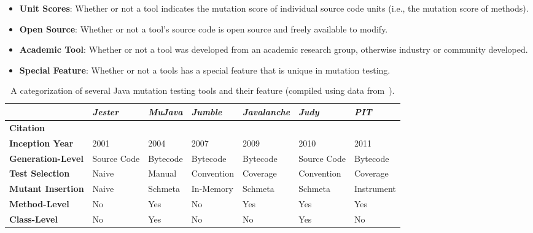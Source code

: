 \begin{itemize}
  \item \textbf{Unit Scores}: Whether or not a tool indicates the mutation score of individual source code units (i.e., the mutation score of methods).
  \item \textbf{Open Source}: Whether or not a tool's source code is open source and freely available to modify.
  \item \textbf{Academic Tool}: Whether or not a tool was developed from an academic research group, otherwise industry or community developed.
  \item \textbf{Special Feature}: Whether or not a tools has a special feature that is unique in mutation testing.
\end{itemize}

\begin{table}
  \centering
  \caption{A categorization of several Java mutation testing tools and their feature (compiled using data from~\cite{PIT, MR10}).}
  \label{tab:mutation_tools}
  \begin{threeparttable}
    \begin{tabular}{|l|l|l|l|l|l|l|}
      \rowcolor[RGB]{169,196,223}
      \hline & \textbf{\emph{Jester}} & \textbf{\emph{MuJava}} & \textbf{\emph{Jumble}} & \textbf{\emph{Javalanche}} & \textbf{\emph{Judy}} & \textbf{\emph{PIT}} \\
      \hline \cellcolor[RGB]{169,196,223} \textbf{Citation} & \cite{Jester} & \cite{MOK05} & \cite{Jumble} & \cite{SZ09} & \cite{MR10} & \cite{PIT} \\
      \hline \cellcolor[RGB]{169,196,223} \textbf{Inception Year} & 2001 & 2004 & 2007 & 2009 & 2010 & 2011 \\
      \hline \cellcolor[RGB]{169,196,223} \textbf{Generation-Level} & Source Code & Bytecode & Bytecode & Bytecode & Source Code & Bytecode \\
      \hline \cellcolor[RGB]{169,196,223} \textbf{Test Selection} & Naive\tnote{f} & Manual & Convention & Coverage & Convention & Coverage \\
      \hline \cellcolor[RGB]{169,196,223} \textbf{Mutant Insertion} & Naive\tnote{f} & Schmeta & In-Memory & Schmeta & Schmeta\tnote{c} & Instrument \\
      \hline \cellcolor[RGB]{169,196,223} \textbf{Method-Level} & No & Yes & No & Yes & Yes & Yes \\
      \hline \cellcolor[RGB]{169,196,223} \textbf{Class-Level} & No & Yes & No & No & Yes\tnote{b} & No \\

\end{tabular}
\end{threeparttable}
\end{table}
